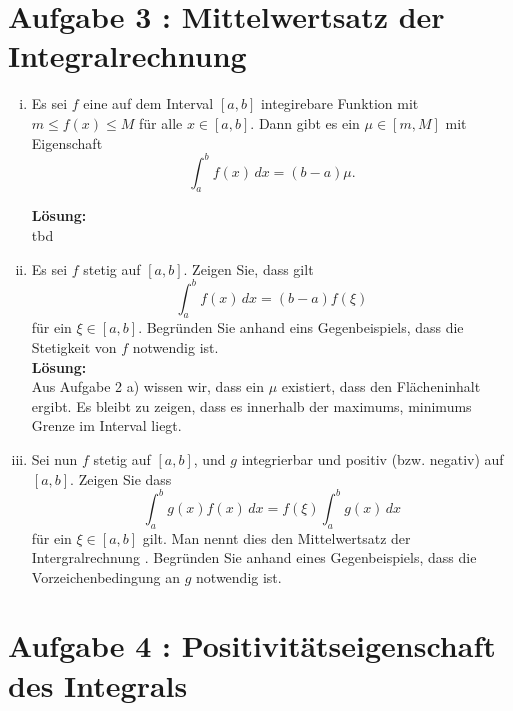 \documentclass[11pt,a4paper,ngerman]{article}
\begin{document}
\section*{Aufgabe 3 : \mdseries Mittelwertsatz der Integralrechnung}

\begin{enumerate}[i)]
    \item Es sei $f$ eine auf dem Interval $[a,b]$ integirebare Funktion mit $m \leq f(x) \leq M$ für alle $x\in[a,b]$. Dann gibt es ein $\mu \in [m,M]$ mit Eigenschaft
$$
    \int_{a}^{b} f(x) \, dx = (b - a) \mu.
$$

\textbf{Lösung:}\\

tbd

    \item Es sei $f$ stetig auf $[a,b]$. Zeigen Sie, dass gilt 
$$
    \int_{a}^{b} f(x)\, dx = (b-a) f(\xi)
$$
für ein $\xi\in [a,b]$. Begründen Sie anhand eins Gegenbeispiels, dass die Stetigkeit von $f$ notwendig ist.\\

\textbf{Lösung:}\\


Aus Aufgabe 2 a) wissen wir, dass ein $\mu$ existiert, dass den Flächeninhalt ergibt. Es bleibt zu zeigen, dass es innerhalb der maximums, minimums Grenze im Interval liegt.



    \item Sei nun $f$ stetig auf $[a,b]$, und $g$ integrierbar und positiv (bzw. negativ) auf $[a,b]$. Zeigen Sie dass 
$$
    \int_{a}^{b} g(x)f(x)\, dx = f(\xi) \int_{a}^{b} g(x) \, dx
$$ 
für ein $\xi \in [a,b]$ gilt. Man nennt dies den Mittelwertsatz der Intergralrechnung   . Begründen Sie anhand eines Gegenbeispiels, dass die Vorzeichenbedingung an $g$ notwendig ist. 
\end{enumerate}


\section*{Aufgabe 4 : \mdseries Positivitätseigenschaft des Integrals}
\end{document}
